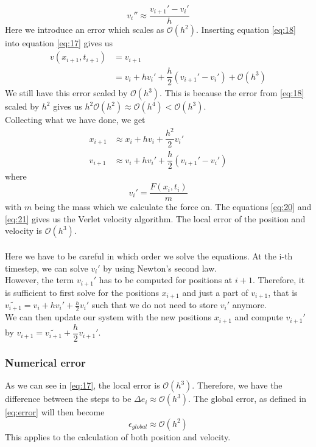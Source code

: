 \documentclass[12pt]{article}
\begin{document}
	\begin{equation}\label{eq:18}
	v_i'' \approx \dfrac{v_{i+1}' - v_i'}{h}
	\end{equation}
	Here we introduce an error which scales as $\mathcal{O}(h^2)$.
	Inserting equation \ref{eq:18} into equation \ref{eq:17} gives us
	\begin{equation} \label{eq:19}
	\begin{aligned}
	v(x_{i+1},t_{i+1}) &=v_{i+1} \\
	&= v_i + hv_i' + \dfrac{h}{2} \left( v_{i+1}' - v_i' \right) + \mathcal{O}(h^3) 
	\end{aligned}
	\end{equation}
	We still have this error scaled by $\mathcal{O}(h^3)$. This is because the error from \ref{eq:18} scaled by $h^2$ gives us $h^2\mathcal{O}(h^2) \approx \mathcal{O}(h^4) < \mathcal{O}(h^3)$. \\
	Collecting what we have done, we get
	\begin{align}
		x_{i+1} &\approx x_i + hv_i + \dfrac{h^2}{2}v_i' \label{eq:20} \\
		v_{i+1} &\approx v_i + hv_i' + \dfrac{h}{2} \left( v_{i+1}' - v_i' \right)\label{eq:21}
	\end{align}
	where
	\begin{equation*}
		v_i' = \dfrac{F(x_i,t_i)}{m}
	\end{equation*}
	with $m$ being the mass which we calculate the force on. 
	The equations \ref{eq:20} and \ref{eq:21} gives us the Verlet velocity algorithm. The local error of the position and velocity is $\mathcal{O}(h^3)$. \\ \\Here we have to be careful in which order we solve the equations. At the i-th timestep, we can solve $v_i'$ by using Newton's second law. \\ However, the term $v_{i+1}'$ has to be computed for positions at $i+1$. Therefore, it is sufficient to first solve for the positions $x_{i+1}$ and just a part of $v_{i+1}$, that is $\tilde{v_{i+1}} = v_i + hv_i' + \frac{h}{2} v_{i}'$ such that we do not need to store $v_i'$ anymore. \\We can then update our system with the new positions $x_{i+1}$ and compute $v_{i+1}'$ by $v_{i+1} = \tilde{v_{i+1}}  + \dfrac{h}{2}v_{i+1}' $. \\ 
	\subsubsection{Numerical error} \label{subsub:err_v}
	As we can see in \ref{eq:17}, the local error is $\mathcal{O}(h^3)$. Therefore, we have the difference between the steps to be $\Delta e_i \approx \mathcal{O}(h^3)$. The global error, as defined in \ref{eq:error} will then become 
	\begin{equation*}
		\epsilon_{global} \approx \mathcal{O}(h^2)
	\end{equation*}
	This applies to the calculation of both position and velocity. 
\end{document}
